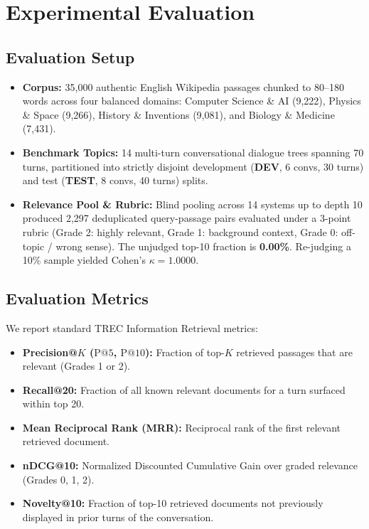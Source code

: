 \documentclass[10pt,a4paper,twocolumn]{article}
\begin{document}
\section{Experimental Evaluation}
\label{sec:evaluation}

\subsection{Evaluation Setup}
\begin{itemize}
    \item \textbf{Corpus:} 35,000 authentic English Wikipedia passages chunked to 80--180 words across four balanced domains: Computer Science \& AI (9,222), Physics \& Space (9,266), History \& Inventions (9,081), and Biology \& Medicine (7,431).
    \item \textbf{Benchmark Topics:} 14 multi-turn conversational dialogue trees spanning 70 turns, partitioned into strictly disjoint development (\textbf{DEV}, 6 convs, 30 turns) and test (\textbf{TEST}, 8 convs, 40 turns) splits.
    \item \textbf{Relevance Pool \& Rubric:} Blind pooling across 14 systems up to depth 10 produced 2,297 deduplicated query-passage pairs evaluated under a 3-point rubric (Grade 2: highly relevant, Grade 1: background context, Grade 0: off-topic / wrong sense). The unjudged top-10 fraction is \textbf{0.00\%}. Re-judging a 10\% sample yielded Cohen's $\kappa = 1.0000$.
\end{itemize}

\subsection{Evaluation Metrics}
We report standard TREC Information Retrieval metrics:
\begin{itemize}
    \item \textbf{Precision@$K$ ($\text{P@5}$, $\text{P@10}$):} Fraction of top-$K$ retrieved passages that are relevant (Grades 1 or 2).
    \item \textbf{Recall@20:} Fraction of all known relevant documents for a turn surfaced within top 20.
    \item \textbf{Mean Reciprocal Rank (MRR):} Reciprocal rank of the first relevant retrieved document.
    \item \textbf{nDCG@10:} Normalized Discounted Cumulative Gain over graded relevance (Grades 0, 1, 2).
    \item \textbf{Novelty@10:} Fraction of top-10 retrieved documents not previously displayed in prior turns of the conversation.
\end{itemize}
\end{document}
